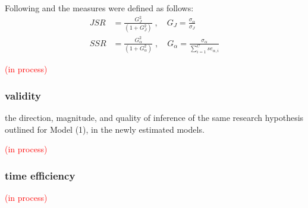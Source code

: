 Following \citet{Fisher_1992} and \citet{Wright_1996} the measures were defined as follows:
%
\begin{align}
	JSR &= \frac{ G^{2}_{J} }{ (1 + G^{2}_{J}) }\; , \quad G_{J} = \frac{ \sigma_{\alpha} } { \sigma_{J} } \label{eq:JSR} \\
	SSR &= \frac{ G^{2}_{\alpha} }{ (1 + G^{2}_{\alpha}) }\; , \quad G_{\alpha} = \frac{ \sigma_{\alpha} } { \sum_{i=1}^{C} se_{\alpha, i} } \label{eq:SSR}
\end{align}
%

\textcolor{red}{(in process)}

\begin{comment}
	compare the Scale Separation Reliability (SSR, an inter-rater reliability measure), coming from CJ methods, with others for other methods
	
	- No intra-rater reliability, also known as test-retest reliability (Verhavert_2018, Reliability_wiki_2022) 
	- No Inter-method reliability,  assesses the degree to which test scores are consistent when there is a variation in the methods or instruments used (Verhavert_2018, Reliability_wiki_2022) 
	- No comparison of SSR vs the true correlation of the latent scale and entropy measures 
	* Justification: (Verhavert_2018, p. 156) " simulation studies could resolve the inconclusiveness regarding the SSR as a correlation with the truth."
\end{comment}
%
%
\subsubsection{validity}
%
the direction, magnitude, and quality of inference of the same research hypothesis outlined for Model (1), in the newly estimated models.

\textcolor{red}{(in process)}

\begin{comment}
	correlate latent scores (from different methods) with entropy measures (see research proposal)
	
	\textbf{critique:} What about decision statements or think at loud rating process? (is it possible), \citet{Lesterhuis_2018} has shown their usefulness, while \citet{Boonen_et_al_2020} signals the need to know about the inner working of judgment processes.
\end{comment}
%
%
\subsubsection{time efficiency}
%
\textcolor{red}{(in process)}

